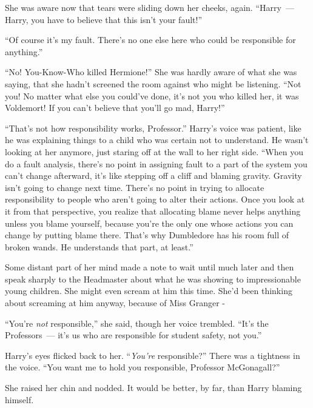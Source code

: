 She was aware now that tears were sliding down her cheeks, again. ``Harry~--- Harry, you have to believe that this isn't your fault!''

``Of course it's my fault. There's no one else here who could be responsible for anything.''

``No! You-Know-Who killed Hermione!'' She was hardly aware of what she was saying, that she hadn't screened the room against who might be listening. ``Not you! No matter what else you could've done, it's not you who killed her, it was Voldemort! If you can't believe that you'll go mad, Harry!''

``That's not how responsibility works, Professor.'' Harry's voice was patient, like he was explaining things to a child who was certain not to understand. He wasn't looking at her anymore, just staring off at the wall to her right side. ``When you do a fault analysis, there's no point in assigning fault to a part of the system you can't change afterward, it's like stepping off a cliff and blaming gravity. Gravity isn't going to change next time. There's no point in trying to allocate responsibility to people who aren't going to alter their actions. Once you look at it from that perspective, you realize that allocating blame never helps anything unless you blame yourself, because you're the only one whose actions you can change by putting blame there. That's why Dumbledore has his room full of broken wands. He understands that part, at least.''

Some distant part of her mind made a note to wait until much later and then speak sharply to the Headmaster about what he was showing to impressionable young children. She might even scream at him this time. She'd been thinking about screaming at him anyway, because of Miss Granger -

``You're \emph{not} responsible,'' she said, though her voice trembled. ``It's the Professors~--- it's us who are responsible for student safety, not you.''

Harry's eyes flicked back to her. ``\emph{You're} responsible?'' There was a tightness in the voice. ``You want me to hold you responsible, Professor McGonagall?''

She raised her chin and nodded. It would be better, by far, than Harry blaming himself.

